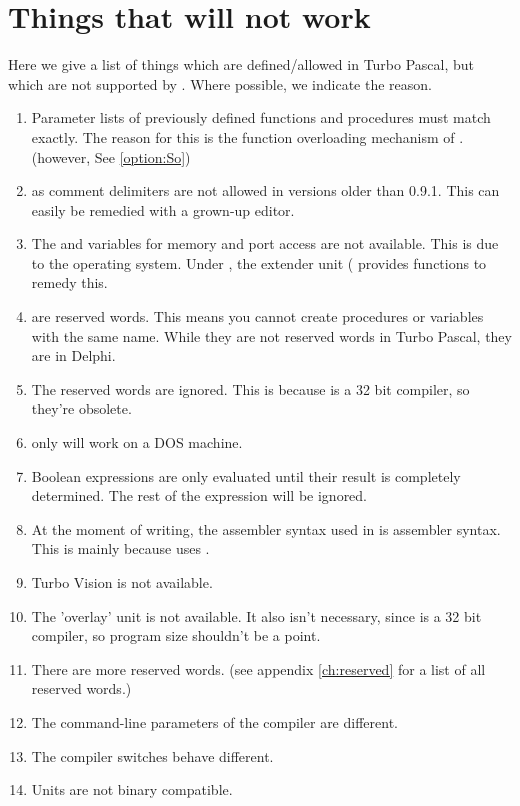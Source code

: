 \documentclass{report}
\newcommand{\seeo}[1]{See \ref{option:#1}}
\begin{document}
\section{Things that will not work}
Here we give a list of things which are defined/allowed in Turbo Pascal, but
which are not supported by \fpc. Where possible, we indicate the reason. 
\begin{enumerate}
\item Parameter lists of previously defined functions and procedures must
match exactly. The reason for this is the function overloading mechanism of
\fpc. (however, \seeo{So})
\item {} as comment delimiters are not allowed in versions
older than 0.9.1. This can easily be remedied with a grown-up editor. 
\item The  and  variables for memory and port
access are not available. This is due to the operating system. Under
\dos, the extender unit ( provides functions to remedy this.
\item {} are reserved words.
This means you cannot create procedures or variables with the same name.
While they are not reserved words in Turbo Pascal, they are in Delphi.
\item The reserved words  are ignored. This is
because \fpc is a 32 bit compiler, so they're obsolete.
\item {} only will work on a DOS machine.
\item Boolean expressions are only evaluated until their result is completely
determined. The rest of the expression will be ignored.
\item At the moment of writing, the assembler syntax used in \fpc is 
assembler syntax. This is mainly because \fpc uses \gnu {}.
\item Turbo Vision is not available.
\item The 'overlay' unit is not available. It also isn't necessary, since
\fpc is a 32 bit compiler, so program size shouldn't be a point.
\item There are more reserved words. (see appendix \ref{ch:reserved} for a
list of all reserved words.)
\item The command-line parameters of the compiler are different.
\item The compiler switches behave different.
\item Units are not binary compatible.
\end{enumerate}
\end{document}

